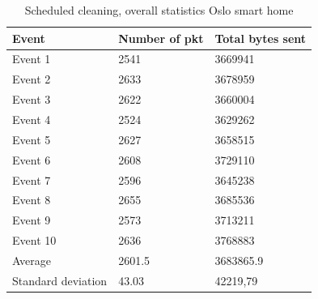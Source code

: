 \begin{table}[H]
\centering
\caption{Scheduled cleaning, overall statistics Oslo smart home}
\label{tab:scoverall}
\begin{tabular}{|l|l|l|}
\hline
\textbf{Event} & \textbf{Number of pkt} & \textbf{Total bytes sent} \\ \hline
Event 1        & 2541                   & 3669941                   \\ \hline
Event 2        & 2633                   & 3678959                   \\ \hline
Event 3        & 2622                   & 3660004                   \\ \hline
Event 4        & 2524                   & 3629262                   \\ \hline
Event 5        & 2627                   & 3658515                   \\ \hline
Event 6        & 2608                   & 3729110                   \\ \hline
Event 7        & 2596                   & 3645238                   \\ \hline
Event 8        & 2655                   & 3685536                   \\ \hline
Event 9        & 2573                   & 3713211                   \\ \hline
Event 10       & 2636                   & 3768883                   \\ \hline
Average        & 2601.5                 & 3683865.9                 \\ \hline
Standard deviation        & 43.03       & 42219,79               \\ \hline
\end{tabular}
\end{table}

